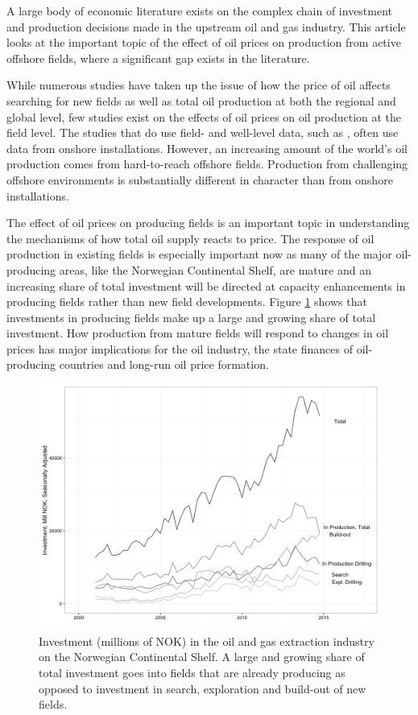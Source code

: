 \documentclass[12pt]{article}
\begin{document}
A large body of economic literature exists on the complex chain of investment and production decisions made in the upstream oil and gas industry. This article looks at the important topic of the effect of oil prices on production from active offshore fields, where a significant gap exists in the literature.

While numerous studies have taken up the issue of how the price of oil affects searching for new fields as well as total oil production at both the regional and global level, few studies exist on the effects of oil prices on oil production at the field level. The studies that do use field- and well-level data, such as \citet{rao_taxation_2010}, often use data from onshore installations.  However, an increasing amount of the world's oil production comes from hard-to-reach offshore fields.  Production from challenging offshore environments is substantially different in character than from onshore installations.

The effect of oil prices on producing fields is an important topic in understanding the mechanisms of how total oil supply reacts to price. The response of oil production in existing fields is especially important now as many of the major oil-producing areas, like the Norwegian Continental Shelf, are mature and an increasing share of total investment will be directed at capacity enhancements in producing fields rather than new field developments. Figure \ref{investment} shows that investments in producing fields make up a large and growing share of total investment. How production from mature fields will respond to changes in oil prices has major implications for the oil industry, the state finances of oil-producing countries and long-run oil price formation.

\begin{figure}
	\center
	\includegraphics[width=.9\textwidth]{figures/investment.png}
	\caption{Investment (millions of NOK) in the oil and gas extraction industry on the Norwegian Continental Shelf. A large and growing share of total investment goes into fields that are already producing as opposed to investment in search, exploration and build-out of new fields.}
	\label{investment}
\end{figure} 
\end{document}
